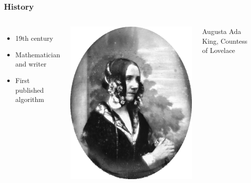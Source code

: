 \documentclass{beamer}
\begin{document}
\begin{frame}
    \frametitle{History}
    \begin{columns}
        \begin{itemize}
            \item 19th century  
            \item Mathematician and writer
            \item First published algorithm
        \end{itemize}
        
        \centering
        
        \includegraphics[scale=0.16]{figures/ada.png}
        
        \bigskip
        
        {\scriptsize Augusta Ada King, Countess of Lovelace}
    \end{columns}
    
\end{frame}   
\end{document}

